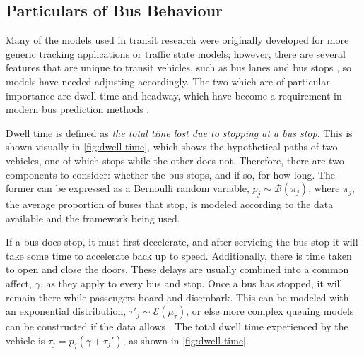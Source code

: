 






\subsection{Particulars of Bus Behaviour}
\label{sec:bus-behaviour}


Many of the models used in transit research were originally developed for
more generic tracking applications or traffic state models;
however, there are several features that are unique to transit vehicles,
such as bus lanes and bus stops \citep{Yu_2011},
so models have needed adjusting accordingly.
The two which are of particular importance are dwell time and headway,
which have become a requirement in modern bus prediction methods
\citep{Jeong_2005,Hans_2014,Hans_2015,Cats_2016}.


Dwell time is defined as \emph{the total time lost due to stopping at a bus stop}.
This is shown visually in \cref{fig:dwell-time},
which shows the hypothetical paths of two vehicles,
one of which stops while the other does not.
Therefore, there are two components to consider:
whether the bus stops, and if so, for how long.
The former can be expressed as a Bernoulli random variable, $p_j \sim \mathcal{B}(\pi_j)$,
where $\pi_j$, the average proportion of buses that stop,
is modeled according to the data available and the framework being used.


If a bus does stop, it must first decelerate,
and after servicing the bus stop it will take some time to accelerate back up to speed.
Additionally, there is time taken to open and close the doors.
These delays are usually combined into a common affect, $\gamma$,
as they apply to every bus and stop.
Once a bus has stopped, it will remain there while passengers board and disembark.
This can be modeled with an exponential distribution,
$\tau'_j \sim \mathcal{E}(\mu_\tau)$,
or else more complex queuing models can be constructed if the data allows
\citep{Hans_2015}.
The total dwell time experienced by the vehicle is $\tau_j = p_j(\gamma + \tau_j')$,
as shown in \cref{fig:dwell-time}.


